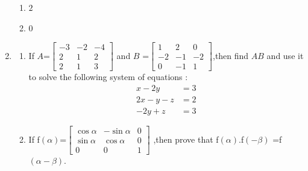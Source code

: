 \documentclass[12pt,-letter paper]{article}
\providecommand{\myvec}[1]{\ensuremath{\begin{bmatrix}#1\end{bmatrix}}}
\begin{document}
\begin{enumerate}
\begin{enumerate}[label=(\alph*)]
    \item $2$
    \item $0$
\end{enumerate}
\item\begin{enumerate}[label=(\alph*)]
    \item If $A$=$\myvec{ -3 & -2 & -4\\2 & 1 & 2\\2 & 1 & 3}$
and $B$ =$\myvec{  1 & 2 & 0\\-2 & -1 & -2\\0 & -1 & 1}$,then find $AB$ and use it to solve the following system of equations :
\begin{align} x - 2y &= 3\\2x - y - z &= 2\\-2y + z &= 3\end{align}
\item If f\((\alpha)\)=$\myvec{
    \cos\alpha & -\sin\alpha & 0\\
    \sin\alpha & \cos\alpha & 0\\
    0 & 0 & 1}$
 ,then prove that
     f\((\alpha)\).f\((-\beta)\) =f\((\alpha - \beta)\).
\end{enumerate}
 \end{enumerate}
\end{document}

